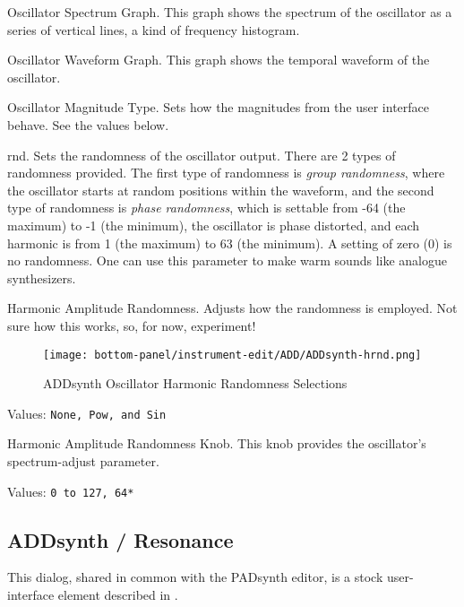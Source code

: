    \setcounter{ItemCounter}{0}      %

   Oscillator Spectrum Graph.
   This graph shows the spectrum of the oscillator as a series of vertical
   lines, a kind of frequency histogram.

   Oscillator Waveform Graph.
   This graph shows the temporal waveform  of the oscillator.

   Oscillator Magnitude Type.
   Sets how the magnitudes from the user interface behave.  See the values
   below.

   rnd. Sets the randomness of the oscillator output. There are 2 types of
   randomness provided.  The first type of randomness is
   \textsl{group randomness},
   where the oscillator starts at random positions within the waveform,
   and the second type of randomness is
   \textsl{phase randomness},
   which is settable from -64 (the maximum) to -1 (the minimum),
   the oscillator is phase distorted,
   and each harmonic is from 1 (the maximum) to 63 (the minimum).
   A setting of zero (0) is no randomness.
   One can use this parameter to make warm sounds like
   analogue synthesizers.

   Harmonic Amplitude Randomness.
   Adjusts how the randomness is employed.
   Not sure how this works, so, for now, experiment!

\begin{figure}[H]
   \centering 
   \texttt{[image: bottom-panel/instrument-edit/ADD/ADDsynth-hrnd.png]}
   \caption{ADDsynth Oscillator Harmonic Randomness Selections}
   \label{fig:addsynth_hrnd}
\end{figure}

   Values: \texttt{None, Pow, and Sin}

   Harmonic Amplitude Randomness Knob.
   This knob provides the oscillator's spectrum-adjust parameter.

   Values: \texttt{0 to 127, 64*}

\subsection{ADDsynth / Resonance}
\label{subsec:addsynth_resonance}

   This dialog, shared in common with the PADsynth editor, is a stock
   user-interface element described in
   .

